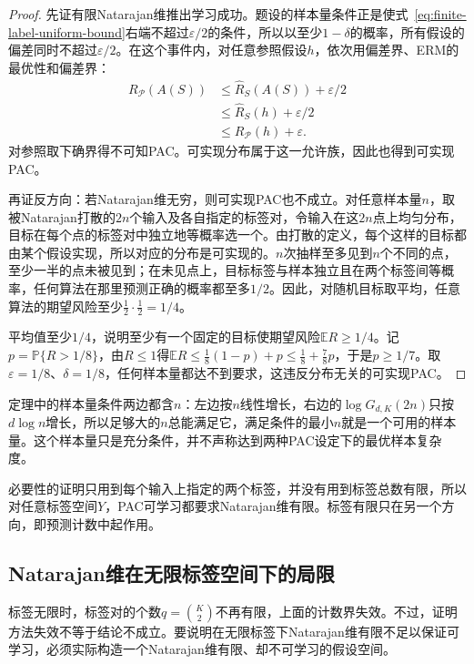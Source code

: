 \begin{proof}
先证有限Natarajan维推出学习成功。题设的样本量条件正是使式~\eqref{eq:finite-label-uniform-bound}右端不超过$\varepsilon/2$的条件，所以以至少$1-\delta$的概率，所有假设的偏差同时不超过$\varepsilon/2$。在这个事件内，对任意参照假设$h$，依次用偏差界、ERM的最优性和偏差界：
\begin{align*}
 R_{\mathcal P}(A(S))&\leq\hat R_S(A(S))+\varepsilon/2\\
 &\leq\hat R_S(h)+\varepsilon/2\\
 &\leq R_{\mathcal P}(h)+\varepsilon.
\end{align*}
对参照取下确界得不可知PAC。可实现分布属于这一允许族，因此也得到可实现PAC。

再证反方向：若Natarajan维无穷，则可实现PAC也不成立。对任意样本量$n$，取被Natarajan打散的$2n$个输入及各自指定的标签对，令输入在这$2n$点上均匀分布，目标在每个点的标签对中独立地等概率选一个。由打散的定义，每个这样的目标都由某个假设实现，所以对应的分布是可实现的。$n$次抽样至多见到$n$个不同的点，至少一半的点未被见到；在未见点上，目标标签与样本独立且在两个标签间等概率，任何算法在那里预测正确的概率都至多$1/2$。因此，对随机目标取平均，任意算法的期望风险至少$\frac12\cdot\frac12=1/4$。

平均值至少$1/4$，说明至少有一个固定的目标使期望风险$\mathbb ER\geq1/4$。记$p=\mathbb P\{R>1/8\}$，由$R\leq1$得$\mathbb ER\leq\frac18(1-p)+p\leq\frac18+\frac78p$，于是$p\geq1/7$。取$\varepsilon=1/8$、$\delta=1/8$，任何样本量都达不到要求，这违反分布无关的可实现PAC。
\end{proof}

定理中的样本量条件两边都含$n$：左边按$n$线性增长，右边的$\log G_{d,K}(2n)$只按$d\log n$增长，所以足够大的$n$总能满足它，满足条件的最小$n$就是一个可用的样本量。这个样本量只是充分条件，并不声称达到两种PAC设定下的最优样本复杂度。

必要性的证明只用到每个输入上指定的两个标签，并没有用到标签总数有限，所以对任意标签空间$Y$，PAC可学习都要求Natarajan维有限。标签有限只在另一个方向，即预测计数中起作用。

\subsection{Natarajan维在无限标签空间下的局限}
\label{sec:multiclass-erm-limitations}

标签无限时，标签对的个数$q=\binom K2$不再有限，上面的计数界失效。不过，证明方法失效不等于结论不成立。要说明在无限标签下Natarajan维有限不足以保证可学习，必须实际构造一个Natarajan维有限、却不可学习的假设空间。

